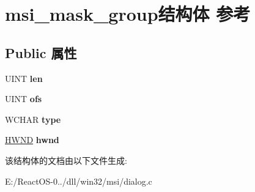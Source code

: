 \hypertarget{structmsi__mask__group}{}\section{msi\+\_\+mask\+\_\+group结构体 参考}
\label{structmsi__mask__group}
\subsection*{Public 属性}
\begin{DoxyCompactItemize}
\item 
\mbox{\label{structmsi__mask__group_afdb6bff2be00f1f7eb1bf557ff29b94d}} 
U\+I\+NT {\bfseries len}
\item 
\mbox{\label{structmsi__mask__group_ac5eb62a03086ebd6e331bfffaacc6b33}} 
U\+I\+NT {\bfseries ofs}
\item 
\mbox{\label{structmsi__mask__group_a98d14fa0411d70d45577e510f9496c34}} 
W\+C\+H\+AR {\bfseries type}
\item 
\mbox{\label{structmsi__mask__group_a330582dddd0860291396873af52058b1}} 
\hyperlink{interfacevoid}{H\+W\+ND} {\bfseries hwnd}
\end{DoxyCompactItemize}


该结构体的文档由以下文件生成\+:\begin{DoxyCompactItemize}
\item 
E\+:/\+React\+O\+S-\/0../dll/win32/msi/dialog.\+c\end{DoxyCompactItemize}
